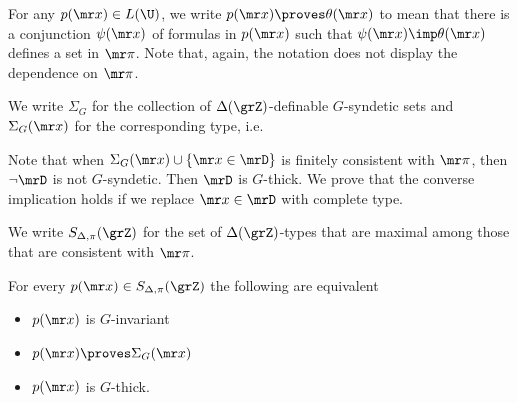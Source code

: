 For any $p({\mr x})\in L(\U)$, we write $p({\mr x})\proves\theta({\mr x})$ to mean that there is a conjunction $\psi({\mr x})$ of formulas in $p({\mr x})$ such that $\psi({\mr x})\imp\theta({\mr x})$ defines a set in ${\mr\pi}$.
Note that, again, the notation does not display the dependence on ${\mr\pi}$.


We write \emph{$\Sigma_G$\/} for the collection of $\Delta(\grZ)$-definable $G$-syndetic sets and $\Sigma_G({\mr x})$ for the corresponding type, i.e.


Note that when $\Sigma_G({\mr x})\cup\{{\mr x}\in\mrD\}$ is finitely consistent with ${\mr\pi}$, then $\neg\mrD$ is not $G$-syndetic.
Then $\mrD$ is $G$-thick.
We prove that the converse implication holds if we replace ${\mr x}\in\mrD$ with complete type.

We write $S_{\Delta,\pi}(\grZ)$ for the set of $\Delta(\grZ)$-types that are maximal among those that are consistent with ${\mr\pi}$.

\begin{theorem}\label{thm_syndetic_invariant}
  For every $p({\mr x})\in S_{\Delta,\pi}(\grZ)$ the following are equivalent
  \begin{itemize}
    \item[1.] $p({\mr x})$ is $G$-invariant
    \item[2.] $p({\mr x})\proves\Sigma_G({\mr x})$
    \item[3.] $p({\mr x})$ is $G$-thick.
  \end{itemize}
\end{theorem}


